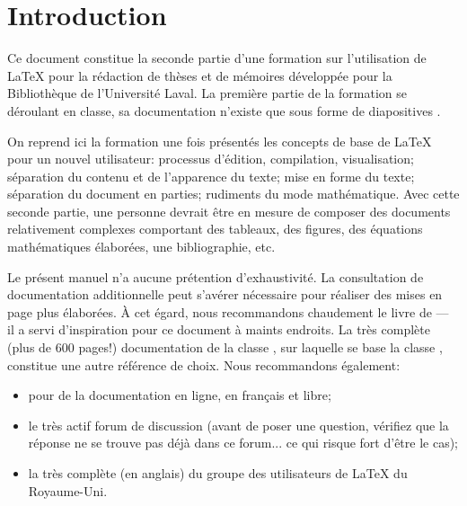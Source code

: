 \chapter{Introduction}
\label{chap:introduction}

Ce document constitue la seconde partie d'une formation sur
l'utilisation de {\LaTeX} pour la rédaction de thèses et de mémoires
développée pour la Bibliothèque de l'Université Laval. La première
partie de la formation se déroulant en classe, sa documentation
n'existe que sous forme de diapositives \citep{UL:latex:1}.

On reprend ici la formation une fois présentés les concepts de base de
{\LaTeX} pour un nouvel utilisateur: processus d'édition, compilation,
visualisation; séparation du contenu et de l'apparence du texte; mise
en forme du texte; séparation du document en parties; rudiments du
mode mathématique. Avec cette seconde partie, une personne devrait
être en mesure de composer des documents relativement complexes
comportant des tableaux, des figures, des équations mathématiques
élaborées, une bibliographie, etc.

Le présent manuel n'a aucune prétention d'exhaustivité. La
consultation de documentation additionnelle peut s'avérer nécessaire
pour réaliser des mises en page plus élaborées. À cet égard, nous
recommandons chaudement le livre de \citet{Kopka:latex:4e} --- il a
servi d'inspiration pour ce document à maints endroits. La très
complète (plus de 600 pages!) documentation de la classe
 \citep{memoir}, sur laquelle se base la classe
, constitue une autre référence de choix. Nous
recommandons également:
\begin{itemize}
\item {} pour de la documentation en ligne, en français et
  libre;
\item le très actif forum de discussion
  (avant de poser une question, vérifiez que la réponse ne se trouve
  pas déjà dans ce forum... ce qui risque fort d'être le cas);
\item la très complète
   (en anglais) du groupe des
  utilisateurs de {\LaTeX} du Royaume-Uni.
\end{itemize}

